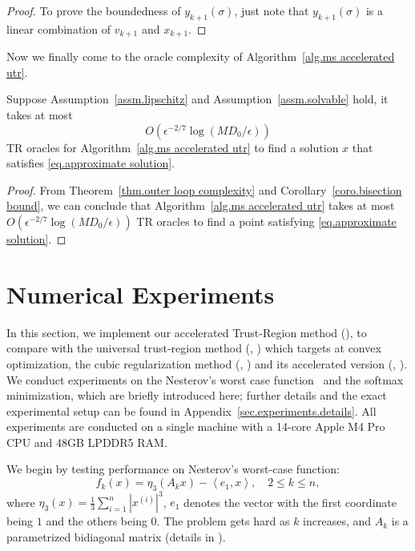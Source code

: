 \documentclass{mcom-l}
\numberwithin{equation}{section}
\begin{document}
\begin{proof}
    To prove the boundedness of $y_{k+1}(\sigma)$, just note that $y_{k+1}(\sigma)$ is a linear combination of $v_{k+1}$ and $x_{k+1}$.
\end{proof}
Now we finally come to the oracle complexity of Algorithm~\ref{alg.ms accelerated utr}.
\begin{theorem}
    \label{thm.final complexity of msatr}
    Suppose Assumption~\ref{assm.lipschitz} and Assumption~\ref{assm.solvable} hold, it takes at most
    \begin{equation}
        \label{eq.final complexity of msatr}
        O\left(\epsilon^{-2/7}\log\left(MD_0/\epsilon\right)\right)
    \end{equation}
    TR oracles for Algorithm~\ref{alg.ms accelerated utr} to find a solution $x$ that satisfies \eqref{eq.approximate solution}.
\end{theorem}
\begin{proof}
    From Theorem~\ref{thm.outer loop complexity} and Corollary~\ref{coro.bisection bound}, we can conclude that Algorithm~\ref{alg.ms accelerated utr} takes at most $O\left(\epsilon^{-2/7}\log \left(MD_0/\epsilon\right)\right)$ TR oracles to find a point satisfying \eqref{eq.approximate solution}.
\end{proof}

\section{Numerical Experiments}\label{sec.experiments}
In this section, we implement our accelerated Trust-Region method (\atr{}), to compare with the universal trust-region method (\utr{}, \citet{jiang2024nonconvexityuniversaltrustregionmethod}) which targets at convex optimization, the cubic regularization method (\arc{}, \citet{nesterov2006cubic}) and its accelerated version (\arca{}, \citet{nesterov2008accelerating}). We conduct experiments on the Nesterov's worst case function~\cite{nesterovImplementableTensorMethods2021} and the softmax minimization, which are briefly introduced here; further details and the exact experimental setup can be found in Appendix~\ref{sec.experiments.details}. All experiments are conducted on a single machine with a 14-core Apple M4 Pro CPU  and 48GB LPDDR5 RAM.

We begin by testing performance on Nesterov's worst-case function:
\[
    f_k(x) = \eta_{3}\left(A_k x\right) - \left\langle e_1, x\right\rangle, \quad 2 \leq k \leq n,
\]
where $\eta_{3}(x) = \frac{1}{3}\sum_{i=1}^n |x^{(i)}|^{3}$, $e_1$ denotes the vector with the first coordinate being $1$ and the others being $0$. The problem gets hard as $k$ increases, and $A_k$ is a parametrized bidiagonal matrix (details in ).
\end{document}
